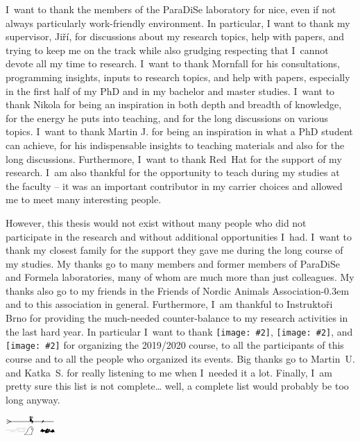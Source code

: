 I~want to thank the members of the ParaDiSe laboratory for nice, even if not always particularly work-friendly environment.
In particular, I want to thank my supervisor, Jiří, for discussions about my research topics, help with papers, and trying to keep me on the track while also grudging respecting that I~cannot devote all my time to research.
I~want to thank Mornfall for his consultations, programming insights, inputs to research topics, and help with papers, especially in the first half of my PhD and in my bachelor and master studies.
I~want to thank Nikola for being an inspiration in both depth and breadth of knowledge, for the energy he puts into teaching, and for the long discussions on various topics.
I~want to thank Martin J. for being an inspiration in what a PhD student can achieve, for his indispensable insights to teaching materials and also for the long discussions.
Furthermore, I~want to thank \mbox{Red Hat} for the support of my research.
I~am also thankful for the opportunity to teach during my studies at the faculty -- it was an important contributor in my carrier choices and allowed me to meet many interesting people.

\newcommand{\icon}[2][\heightof{X}]{\texttt{[image: \#2]}}

However, this thesis would not exist without many people who did not participate in the research and without additional opportunities I~had.
I~want to thank my closest family for the support they gave me during the long course of my studies.
My thanks go to many members and former members of ParaDiSe and Formela laboratories, many of whom are much more than just colleagues.
My thanks also go to my friends in the Friends of Nordic Animals Association\kern-0.3em\mnote[\icon{zverinec}]{Spolek přátel severské zvěře} and to this association in general.
Furthermore, I~am thankful to Instruktoři Brno for providing the much-needed counter-balance to my research activities in the last hard year. In particular I~want to thank \icon[\heightof{a}]{isb}, {\small\icon{isb}}, and \icon{isb} for organizing the 2019/2020 course, to all the participants of this course and to all the people who organized its events.
Big thanks go to Martin~U. and Katka~S. for really listening to me when I~needed it a lot.
Finally, I~am pretty sure this list is not complete… well, a complete list would probably be too long anyway.

\bigskip
\begin{center}
    $\overrightwitchonbroom*{\xrightswishingghost{\qquad}\ \mathrightbat}$
\end{center}

